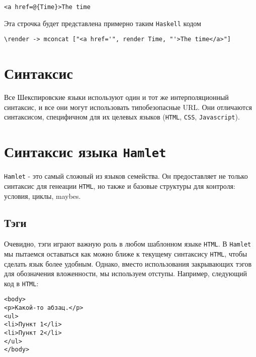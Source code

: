 \begin{lstlisting}
<a href=@{Time}>The time                                                        
\end{lstlisting}
                                                                                
Эта строчка будет представлена примерно таким \texttt{Haskell} кодом 

\begin{lstlisting}
\render -> mconcat ["<a href='", render Time, "'>The time</a>"]     
\end{lstlisting}

\section{Синтаксис}
Все Шекспировские языки используют один и тот же интерполяционный синтаксис, 
и все они могут использовать типобезопасные URL. Они отличаются синтаксисом,
специфичном для их целевых языков (\texttt{HTML}, \texttt{CSS}, \texttt{Javascript}).

\section{Синтаксис языка \texttt{Hamlet}}
\texttt{Hamlet} - это самый сложный из языков семейства. Он предоставляет не только 
синтаксис для генеации \texttt{HTML}, но также и базовые структуры для контроля: 
условия, циклы, maybes.

\subsection{Тэги}
Очевидно, тэги играют важную роль в любом шаблонном языке \texttt{HTML}. В \texttt{Hamlet}
мы пытаемся оставаться как можно ближе к текущему синтаксису \texttt{HTML}, чтобы
сделать язык более удобным. Однако, вместо использования закрывающих тэгов
для обозначения вложенности, мы используем отступы. Например, следующий код
в \texttt{HTML}:

\begin{lstlisting}
<body>                                                                          
<p>Какой-то абзац.</p>                                                          
<ul>                                                                            
<li>Пункт 1</li>                                                                 
<li>Пункт 2</li>                                                                 
</ul>                                                                           
</body>   
\end{lstlisting}

